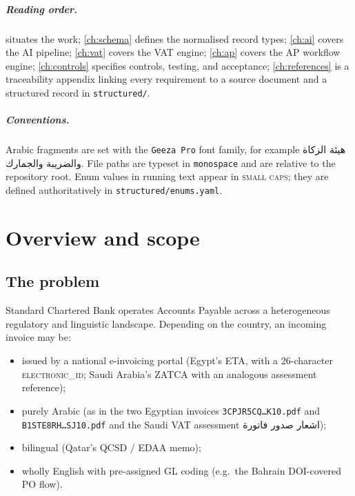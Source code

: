\documentclass[11pt,a4paper,twoside]{report}
\newcommand{\ar}[1]{#1}
\newcommand{\corpus}{}
\begin{document}
\paragraph{Reading order.}  situates the work;
\cref{ch:schema} defines the normalised record types; \cref{ch:ai} covers
the AI pipeline; \cref{ch:vat} covers the VAT engine; \cref{ch:ap}
covers the AP workflow engine; \cref{ch:controls} specifies controls,
testing, and acceptance; \cref{ch:references} is a traceability
appendix linking every requirement to a source document and a structured
record in \corpus\texttt{structured/}.

\paragraph{Conventions.} Arabic fragments are set with the
\texttt{Geeza Pro} font family, for example \ar{هيئة الزكاة والضريبة والجمارك}.
File paths are typeset in \texttt{monospace} and are relative to the
repository root. Enum values in running text appear in \textsc{small
caps}; they are defined authoritatively in
\corpus\texttt{structured/enums.yaml}.
\chapter{Overview and scope}\label{ch:overview}

\section{The problem}

Standard Chartered Bank operates Accounts Payable across a heterogeneous
regulatory and linguistic landscape. Depending on the country, an
incoming invoice may be:

\begin{itemize}
  \item issued by a national e-invoicing portal (Egypt's ETA, with a
        26-character \textsc{electronic\_id}; Saudi Arabia's ZATCA with
        an analogous assessment reference);
  \item purely Arabic (as in the two Egyptian invoices
        \texttt{3CPJR5CQ\ldots K10.pdf} and \texttt{B1STE8RH\ldots SJ10.pdf}
        and the Saudi VAT assessment \ar{اشعار صدور فاتورة});
  \item bilingual (Qatar's QCSD / EDAA memo);
  \item wholly English with pre-assigned GL coding (e.g.\ the Bahrain
        DOI-covered PO flow).
\end{itemize}
\end{document}
